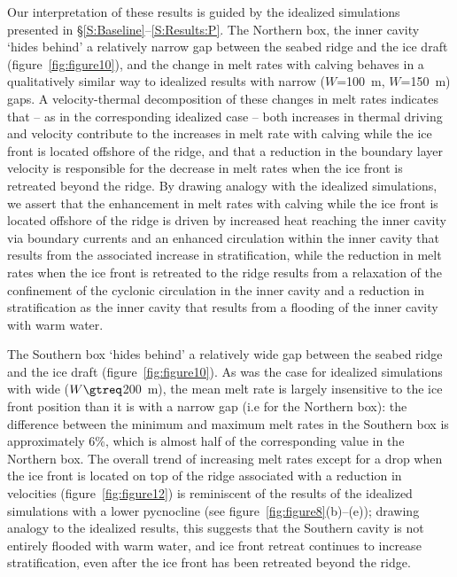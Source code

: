 \documentclass[draft]{agujournal2019}
\begin{document}
Our interpretation of these results is guided by the idealized simulations presented in \S\ref{S:Baseline}--\ref{S:Results:P}. The Northern box, the inner cavity `hides behind' a relatively narrow gap between the seabed ridge and the ice draft (figure~\ref{fig:figure10}), and the change in melt rates with calving behaves in a qualitatively similar way to idealized results with narrow ($W$=100~m, $W$=150~m) gaps. A velocity-thermal decomposition of these changes in melt rates indicates that -- as in the corresponding idealized case -- both increases in thermal driving and velocity contribute to the increases in melt rate with calving while the ice front is located offshore of the ridge, and that a reduction in the boundary layer velocity is responsible for the decrease in melt rates when the ice front is retreated beyond the ridge. By drawing analogy with the idealized simulations, we assert that the enhancement in melt rates with calving while the ice front is located offshore of the ridge is driven by increased heat reaching the inner cavity via boundary currents and an enhanced circulation within the inner cavity that results from the associated increase in stratification, while the reduction in melt rates when the ice front is retreated to the ridge results from a relaxation of the confinement of the cyclonic circulation in the inner cavity and a reduction in stratification as the inner cavity that results from a flooding of the inner cavity with warm water.


The Southern box `hides behind' a relatively wide gap between the seabed ridge and the ice draft (figure~\ref{fig:figure10}). As was the case for idealized simulations with wide ($W \gtreq$200~m), the mean melt rate is largely insensitive to the ice front position than it is with a narrow gap (i.e for the Northern box): the difference between the minimum and maximum melt rates in the Southern box is approximately 6\%, which is almost half of the corresponding value in the Northern box. The overall trend of increasing melt rates except for a drop when the ice front is located on top of the ridge associated with a reduction in velocities (figure~\ref{fig:figure12}) is reminiscent of the results of the idealized simulations with a lower pycnocline (see figure~\ref{fig:figure8}(b)--(e)); drawing analogy to the idealized results, this suggests that the Southern cavity is not entirely flooded with warm water, and ice front retreat continues to increase stratification, even after the ice front has been retreated beyond the ridge.
\end{document}

